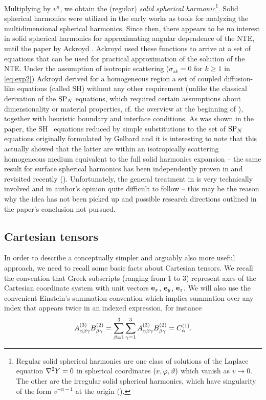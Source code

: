 Multiplying by $v^n$, we obtain the (regular) \textit{solid spherical harmonic}\footnote{Regular solid spherical
harmonics are one class of solutions of the Laplace equation \mbox{$\lap Y = 0$} in spherical coordinates
$(v,\azimuthal,\polar)$ which vanish as $v\to 0$. The other are the irregular solid spherical harmonics, which have
singularity of the form $v^{-n-1}$ at the origin (\cite[Chap. VI]{Byerly}).}. Solid spherical harmonics were utilized
in the early works \cite{Davison, Rumyantsev} as tools for analyzing the multidimensional spherical harmonics. Since
then, there appears to be no interest in solid spherical harmonics for approximating angular dependence of the NTE,
until the paper by Ackroyd \cite{Ackroyd1}. Ackroyd used these functions to arrive at a set of equations that can be
used for practical approximation of the solution of the NTE. Under the assumption of
isotropic scattering ($\sigma_{sk} = 0$ for $k \geq 1$ in \eqref{eq:exp2}) Ackroyd derived for a homogeneous region a set of coupled diffusion-like equations (called SH\PN) without any other
requirement (unlike the classical derivation of the $\SPN$ equations, which required certain assumptions about 
dimensionality or material properties, cf. the overview at the beginning of ),
together with heuristic boundary and interface conditions. As was shown in the paper, the SH\PN~ equations reduced by simple substitutions to the set of 
$\SPN$ equations originally formulated by Gelbard and it is interesting to note that this actually showed that the 
latter are within an isotropically scattering homogeneous medium equivalent to the full solid harmonics expansion -- 
the same result for surface spherical harmonics has been independently proven in \cite{Coppa1} and revisited recently 
(\cite{Coppa2,McClarren1}). Unfortunately, the general treatment in \cite{Ackroyd1} is very technically involved and in 
author's opinion quite difficult to follow -- this may be the reason why the idea has not been picked up and possible 
research directions outlined in the paper's conclusion not pursued.

\subsection{Cartesian tensors}\label{sec:tensors}
In order to describe a conceptually simpler and arguably also more useful approach, we need to recall some basic facts
about Cartesian tensors. We recall the convention that Greek subscripts (ranging from 1 to 3) represent axes of the
Cartesian coordinate system with unit vectors $\be_x$, $\be_y$, $\be_z$. We will also use the convenient Einstein's
summation convention which implies summation over any index that appears twice in an indexed expression, for instance $$
  \AAA[3]{\alpha\beta\gamma}\BBB[2]{\beta\gamma} =
  \suma[\beta]{1}{3}\suma[\gamma]{1}{3}\AAA[3]{\alpha\beta\gamma}\BBB[2]{\beta\gamma} = \CCC[1]{\alpha}.
$$

